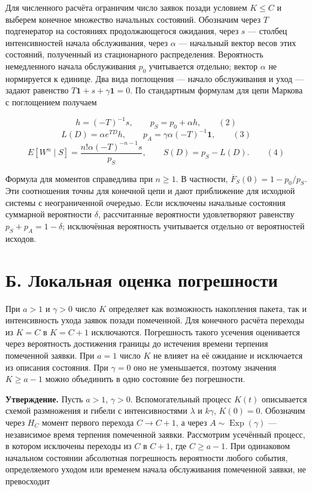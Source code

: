 Для численного расчёта ограничим число заявок позади условием $K\leq C$ и выберем конечное множество начальных состояний. Обозначим через $T$ подгенератор на состояниях продолжающегося ожидания, через $s$ --- столбец интенсивностей начала обслуживания, через $\alpha$ --- начальный вектор весов этих состояний, полученный из стационарного распределения. Вероятность немедленного начала обслуживания $p_0$ учитывается отдельно; вектор $\alpha$ не нормируется к единице. Два вида поглощения --- начало обслуживания и уход --- задают равенство $T\mathbf1+s+\gamma\mathbf1=0$. По стандартным формулам для цепи Маркова с поглощением получаем

\[h=(-T)^{-1}s,\qquad  p_S=p_0+\alpha h,\qquad (2)\]
\[L(D)=\alpha e^{TD}h,\qquad  p_A=\gamma\alpha(-T)^{-1}\mathbf1,\qquad (3)\]
\[E[W^n\mid S]=\frac{n!\alpha(-T)^{-n-1}s}{p_S},\qquad 
 S(D)=p_S-L(D).\qquad (4)\]

Формула для моментов справедлива при $n\geq1$. В частности, $\overline F_S(0)=1-p_0/p_S$. Эти соотношения точны для конечной цепи и дают приближение для исходной системы с неограниченной очередью. Если исключены начальные состояния суммарной вероятности $\delta$, рассчитанные вероятности удовлетворяют равенству $p_S+p_A=1-\delta$; исключённая вероятность учитывается отдельно от вероятностей исходов.

\section*{Б. Локальная оценка погрешности}

При $a>1$ и $\gamma>0$ число $K$ определяет как возможность накопления пакета, так и интенсивность ухода заявок позади помеченной. Для конечного расчёта переходы из $K=C$ в $K=C+1$ исключаются. Погрешность такого усечения оценивается через вероятность достижения границы до истечения времени терпения помеченной заявки. При $a=1$ число $K$ не влияет на её ожидание и исключается из описания состояния. При $\gamma=0$ оно не уменьшается, поэтому значения $K\geq a-1$ можно объединить в одно состояние без погрешности.

\noindent\textbf{Утверждение.}
Пусть $a>1$, $\gamma>0$. Вспомогательный процесс $K(t)$ описывается схемой размножения и гибели с интенсивностями $\lambda$ и $k\gamma$, $K(0)=0$. Обозначим через $H_C$ момент первого перехода $C\to C+1$, а через $A\sim\operatorname{Exp}(\gamma)$ --- независимое время терпения помеченной заявки. Рассмотрим усечённый процесс, в котором исключены переходы из $C$ в $C+1$, где $C\geq a-1$. При одинаковом начальном состоянии абсолютная погрешность вероятности любого события, определяемого уходом или временем начала обслуживания помеченной заявки, не превосходит

